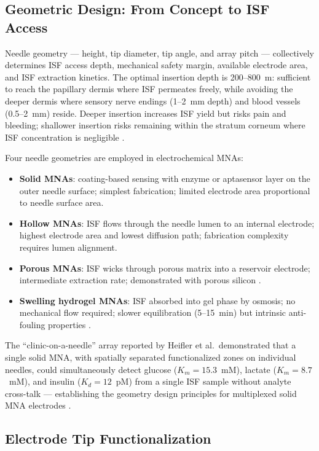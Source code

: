 \documentclass[review,1p]{elsarticle}
\begin{document}
\subsection{Geometric Design: From Concept to ISF Access}
\label{subsec:geometry}

Needle geometry — height, tip diameter, tip angle, and array pitch — collectively determines ISF access depth, mechanical safety margin, available electrode area, and ISF extraction kinetics. The optimal insertion depth is 200--800~\textmu{}m: sufficient to reach the papillary dermis where ISF permeates freely, while avoiding the deeper dermis where sensory nerve endings (1--2~mm depth) and blood vessels (0.5--2~mm) reside. Deeper insertion increases ISF yield but risks pain and bleeding; shallower insertion risks remaining within the stratum corneum where ISF concentration is negligible \cite{Friedel2023}.

Four needle geometries are employed in electrochemical MNAs:
\begin{itemize}
    \item \textbf{Solid MNAs}: coating-based sensing with enzyme or aptasensor layer on the outer needle surface; simplest fabrication; limited electrode area proportional to needle surface area.
    \item \textbf{Hollow MNAs}: ISF flows through the needle lumen to an internal electrode; highest electrode area and lowest diffusion path; fabrication complexity requires lumen alignment.
    \item \textbf{Porous MNAs}: ISF wicks through porous matrix into a reservoir electrode; intermediate extraction rate; demonstrated with porous silicon \cite{Ning2021Porous}.
    \item \textbf{Swelling hydrogel MNAs}: ISF absorbed into gel phase by osmosis; no mechanical flow required; slower equilibration (5--15~min) but intrinsic anti-fouling properties \cite{Zhou2024}.
\end{itemize}

The ``clinic-on-a-needle'' array reported by Heifler et al.\ demonstrated that a single solid MNA, with spatially separated functionalized zones on individual needles, could simultaneously detect glucose ($K_m = 15.3$~mM), lactate ($K_m = 8.7$~mM), and insulin ($K_d = 12$~pM) from a single ISF sample without analyte cross-talk — establishing the geometry design principles for multiplexed solid MNA electrodes \cite{Heifler2021}.

\subsection{Electrode Tip Functionalization}
\label{subsec:functionalization}
\end{document}
